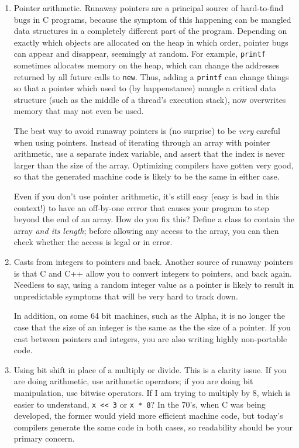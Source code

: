\begin{enumerate}
\item Pointer arithmetic.  Runaway pointers are a principal source
of hard-to-find bugs in C programs, because the symptom of this happening
can be mangled data structures in a completely different part of the program.
Depending on exactly which objects are allocated on the heap in which
order, pointer bugs can appear and disappear, seemingly at random.
For example, {\tt printf} sometimes allocates memory on the heap,
which can change the addresses returned by all future calls to {\tt new}.
Thus, adding a {\tt printf} can change things so that a pointer
which used to (by happenstance) mangle a critical data structure
(such as the middle of a thread's execution stack), now overwrites memory
that may not even be used.

The best way to avoid runaway pointers is (no surprise) to be
{\em very} careful when using pointers.  Instead of iterating
through an array with pointer arithmetic, use a separate index
variable, and assert that the index is never larger than the size
of the array.  Optimizing compilers have gotten very good, so that the
generated machine code is likely to be the same in either case.

Even if you don't use pointer arithmetic, it's still easy
(easy is bad in this context!) to have an off-by-one errror
that causes your program to step beyond the end of an array.
How do you fix this?  Define a class to contain the array
{\em and its length}; before allowing any access to the array,
you can then check whether the access is legal or in error.

\item Casts from integers to pointers and back.  Another source
of runaway pointers is that C and C++ allow you to convert
integers to pointers, and back again.  Needless to say, using a
random integer value as a pointer is likely to result in unpredictable
symptoms that will be very hard to track down.

In addition, on some 64 bit machines, such as the Alpha, it is
no longer the case that the size of an integer is the same as the
the size of a pointer.  If you cast between pointers and integers,
you are also writing highly non-portable code.

\item Using bit shift in place of a multiply or divide.
This is a clarity issue.  If you are doing arithmetic, use
arithmetic operators; if you are doing bit manipulation,
use bitwise operators.  If I am trying to multiply by 8, which is
easier to understand, {\tt x << 3} or {\tt x * 8}?  In the 70's,
when C was being developed, the former would yield more efficient
machine code, but today's compilers generate the same code in both
cases, so readability should be your primary concern.


\end{enumerate}

